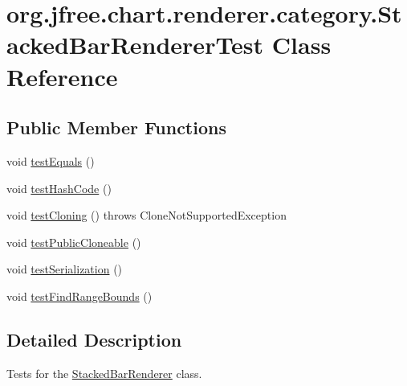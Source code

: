 \hypertarget{classorg_1_1jfree_1_1chart_1_1renderer_1_1category_1_1_stacked_bar_renderer_test}{}\section{org.\+jfree.\+chart.\+renderer.\+category.\+Stacked\+Bar\+Renderer\+Test Class Reference}
\label{classorg_1_1jfree_1_1chart_1_1renderer_1_1category_1_1_stacked_bar_renderer_test}
\subsection*{Public Member Functions}
\begin{DoxyCompactItemize}
\item 
void \mbox{\hyperlink{classorg_1_1jfree_1_1chart_1_1renderer_1_1category_1_1_stacked_bar_renderer_test_a1a623326fd6645d3d37653fa6fd79944}{test\+Equals}} ()
\item 
void \mbox{\hyperlink{classorg_1_1jfree_1_1chart_1_1renderer_1_1category_1_1_stacked_bar_renderer_test_ab576f0ec164883f2cbe2d297b6dbf500}{test\+Hash\+Code}} ()
\item 
void \mbox{\hyperlink{classorg_1_1jfree_1_1chart_1_1renderer_1_1category_1_1_stacked_bar_renderer_test_a530832ad14676a63a5cdddd2dd3afce7}{test\+Cloning}} ()  throws Clone\+Not\+Supported\+Exception 
\item 
void \mbox{\hyperlink{classorg_1_1jfree_1_1chart_1_1renderer_1_1category_1_1_stacked_bar_renderer_test_affa65be3881c15213ad19f28b798d633}{test\+Public\+Cloneable}} ()
\item 
void \mbox{\hyperlink{classorg_1_1jfree_1_1chart_1_1renderer_1_1category_1_1_stacked_bar_renderer_test_a90b1f4609fc23d68f449e04eabe2b67c}{test\+Serialization}} ()
\item 
void \mbox{\hyperlink{classorg_1_1jfree_1_1chart_1_1renderer_1_1category_1_1_stacked_bar_renderer_test_a04f2ada32e254f71efcefca8da45902f}{test\+Find\+Range\+Bounds}} ()
\end{DoxyCompactItemize}


\subsection{Detailed Description}
Tests for the \mbox{\hyperlink{classorg_1_1jfree_1_1chart_1_1renderer_1_1category_1_1_stacked_bar_renderer}{Stacked\+Bar\+Renderer}} class. 

